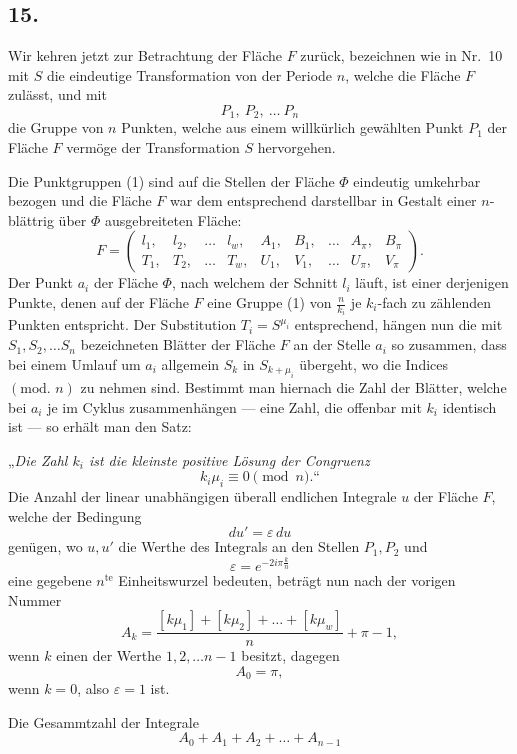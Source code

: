 \documentclass{article}
\begin{document}
\subsection*{15.}

Wir kehren jetzt zur Betrachtung der Fläche $F$ zurück, bezeichnen wie in Nr.~10 mit $S$ die eindeutige Transformation von der Periode $n$, welche die Fläche $F$ zulässt, und mit
\[
P_1, \ P_2, \ \dots \ P_n \tag{1}
\]
die Gruppe von $n$ Punkten, welche aus einem willkürlich gewählten Punkt $P_1$ der Fläche $F$ vermöge der Transformation $S$ hervorgehen.

Die Punktgruppen (1) sind auf die Stellen der Fläche $\Phi$ eindeutig umkehrbar bezogen und die Fläche $F$ war dem entsprechend darstellbar in Gestalt einer $n$-blättrig über $\Phi$ ausgebreiteten Fläche:
\[
F = \begin{pmatrix}
l_1, & l_2, & \dots & l_w, & A_1, & B_1, & \dots & A_\pi, & B_\pi \\
T_1, & T_2, & \dots & T_w, & U_1, & V_1, & \dots & U_\pi, & V_\pi
\end{pmatrix}.
\]
Der Punkt $a_i$ der Fläche $\Phi$, nach welchem der Schnitt $l_i$ läuft, ist einer derjenigen Punkte, denen auf der Fläche $F$ eine Gruppe (1) von $\frac{n}{k_i}$ je $k_i$-fach zu zählenden Punkten entspricht. Der Substitution $T_i = S^{\mu_i}$ entsprechend, hängen nun die mit $S_1, S_2, \dots S_n$ bezeichneten Blätter der Fläche $F$ an der Stelle $a_i$ so zusammen, dass bei einem Umlauf um $a_i$ allgemein $S_k$ in $S_{k+\mu_i}$ übergeht, wo die Indices $(\text{mod. } n)$ zu nehmen sind. Bestimmt man hiernach die Zahl der Blätter, welche bei $a_i$ je im Cyklus zusammenhängen --- eine Zahl, die offenbar mit $k_i$ identisch ist --- so erhält man den Satz:

„\emph{Die Zahl $k_i$ ist die kleinste positive Lösung der Congruenz}
\[
k_i\mu_i \equiv 0 \pmod n\text{.“}
\]
Die Anzahl der linear unabhängigen überall endlichen Integrale $u$ der Fläche $F$, welche der Bedingung
\[
du' = \varepsilon\,du
\]
genügen, wo $u, u'$ die Werthe des Integrals an den Stellen $P_1, P_2$ und
\[
\varepsilon = e^{-2i\pi\frac{k}{n}}
\]
eine gegebene $n^{\text{te}}$ Einheitswurzel bedeuten, beträgt nun nach der vorigen Nummer
\[
A_k = \frac{[k\mu_1] + [k\mu_2] + \dots + [k\mu_w]}{n} + \pi - 1, \tag{2}
\]
wenn $k$ einen der Werthe $1, 2, \dots n-1$ besitzt, dagegen
\[
A_0 = \pi, \tag{3}
\]
wenn $k = 0$, also $\varepsilon = 1$ ist.

Die Gesammtzahl der Integrale
\[
A_0 + A_1 + A_2 + \dots + A_{n-1}
\]
\end{document}
